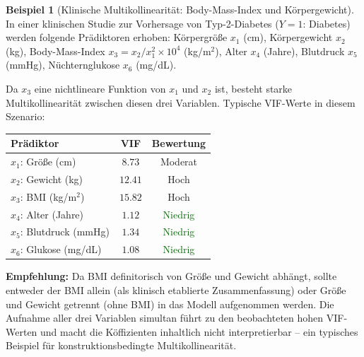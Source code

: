 ﻿\documentclass[12pt, a4paper]{article}
\theoremstyle{definition}
\newtheorem{example}[theorem]{Beispiel}
\theoremstyle{remark}
\begin{document}
\begin{example}[Klinische Multikollinearität: Body-Mass-Index und Körpergewicht]
	\label{ex:vif_bmi}
	In einer klinischen Studie zur Vorhersage von Typ-2-Diabetes ($Y = 1$: Diabetes)
	werden folgende Prädiktoren erhoben: Körpergröße $x_1$ (cm), Körpergewicht $x_2$ (kg),
	Body-Mass-Index $x_3 = x_2 / x_1^2 \times 10^4$ (kg/m$^2$), Alter $x_4$ (Jahre), 
	Blutdruck $x_5$ (mmHg), Nüchternglukose $x_6$ (mg/dL).
	
	Da $x_3$ eine nichtlineare Funktion von $x_1$ und $x_2$ ist, besteht starke 
	Multikollinearität zwischen diesen drei Variablen.
	Typische VIF-Werte in diesem Szenario:
	
	\begin{center}
		\begin{tabular}{lcc}
			\toprule
			Prädiktor & VIF & Bewertung \\
			\midrule
			$x_1$: Größe (cm) & $8.73$ & Moderat \\
			$x_2$: Gewicht (kg) & $12.41$ & \textcolor{accentred}{Hoch} \\
			$x_3$: BMI (kg/m$^2$) & $15.82$ & \textcolor{accentred}{Hoch} \\
			$x_4$: Alter (Jahre) & $1.12$ & \textcolor{darkgreen}{Niedrig} \\
			$x_5$: Blutdruck (mmHg) & $1.34$ & \textcolor{darkgreen}{Niedrig} \\
			$x_6$: Glukose (mg/dL) & $1.08$ & \textcolor{darkgreen}{Niedrig} \\
			\bottomrule
		\end{tabular}
	\end{center}
	
	\textbf{Empfehlung:} Da BMI definitorisch von Größe und Gewicht abhängt, sollte entweder
	der BMI allein (als klinisch etablierte Zusammenfassung) oder Größe und Gewicht getrennt
	(ohne BMI) in das Modell aufgenommen werden. Die Aufnahme aller drei Variablen simultan
	führt zu den beobachteten hohen VIF-Werten und macht die Köffizienten inhaltlich nicht
	interpretierbar -- ein typisches Beispiel für konstruktionsbedingte Multikollinearität.
\end{example}
\end{document}
